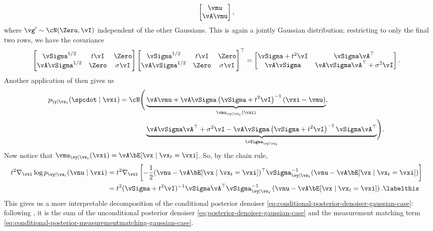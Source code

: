 \documentclass[../../book-main.tex]{subfiles}
\begin{document}
\begin{example}
\begin{equation}
\begin{bmatrix}
      \vmu \\
      \vA\vmu
    \end{bmatrix},
  \end{equation}
  where $\vg' \sim \cN(\Zero, \vI)$ independent of the other Gaussians.
  This is again a jointly Gaussian distribution; restricting to only the final
  two rows, we have the covariance
  \begin{equation*}
    \begin{bmatrix}
      \vSigma^{1/2} & t\vI & \Zero \\
      \vA \vSigma^{1/2} & \Zero & \sigma \vI
    \end{bmatrix}
    \begin{bmatrix}
      \vSigma^{1/2} & t\vI & \Zero \\
      \vA \vSigma^{1/2} & \Zero & \sigma \vI
    \end{bmatrix}^\top
    =
    \begin{bmatrix}
      \vSigma + t^2\vI & \vSigma\vA^\top \\
      \vA\vSigma & \vA\vSigma\vA^\top + \sigma^2 \vI
    \end{bmatrix}.
  \end{equation*}
  Another application of  then gives us
  \begin{equation}
    \begin{split}
    p_{\y \mid \vx_t}(\spcdot \mid \vxi) = \cN\Biggl(
    &\underbrace{%
      \vA\vmu + \vA\vSigma\left( \vSigma + t^2 \vI \right)^{-1}
      \left(
        \vxi - \vmu
      \right)
      }_{\vmu_{\vy \mid \vx_t}(\vxi)}, \\
      &\underbrace{%
        \vA\vSigma\vA^\top + \sigma^2 \vI - \vA\vSigma \left( \vSigma
        + t^2 \vI\right)^{-1} \vSigma \vA^\top
      }_{\vSigma_{\vy\mid \vx_t}}
    \Biggr).
    \end{split}
  \end{equation}
  Now notice that $\vmu_{\vy \mid \vx_t}(\vxi) = \vA \bE[\vx \mid \vx_t=\vxi]$.
  So, by the chain rule,
  \begin{align*}
    t^2 \nabla_{\vxi} \log p_{\vy \mid \vx_t}(\vnu \mid \vxi)
    &=
    t^2 \nabla_{\vxi}\left[
      -\frac{1}{2}
      (\vnu - \vA \bE[\vx \mid \vx_t=\vxi])^\top
      \vSigma_{\vy \mid \vx_t}^{-1}
      (\vnu - \vA \bE[\vx \mid \vx_t=\vxi])
      \right]
    \\
    &= t^2 (\vSigma+t^2 \vI)^{-1}\vSigma\vA^\top\vSigma_{\vy \mid \vx_t}^{-1}\left(
    \vnu - \vA \bE[\vx \mid \vx_t=\vxi] \right).
    \labelthis
    \label{eq:conditional-posterior-measurementmatching-gaussian-case}
  \end{align*}
  This gives us a more interpretable decomposition of the conditional posterior
  denoiser \eqref{eq:conditional-posterior-denoiser-gaussian-case}: following
  , it is the sum of the
  unconditional posterior denoiser \eqref{eq:posterior-denoiser-gaussian-case}
  and the measurement matching term
  \eqref{eq:conditional-posterior-measurementmatching-gaussian-case}.


\end{example}
\end{document}
